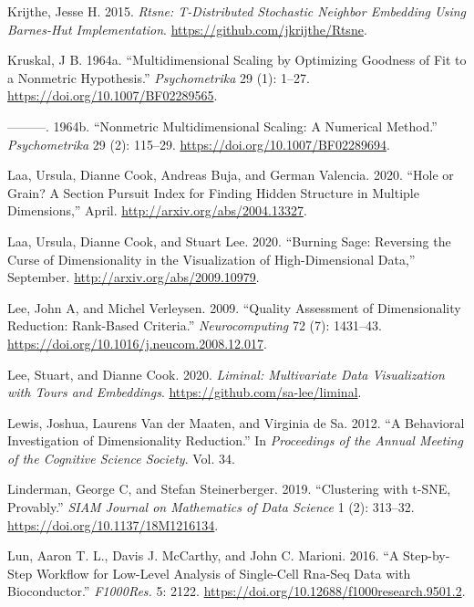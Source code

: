 \documentclass[article,notitle]{jdssv}
\begin{document}
\leavevmode\hypertarget{ref-Rtsne}{}%
Krijthe, Jesse H. 2015. \emph{Rtsne: T-Distributed Stochastic Neighbor Embedding Using Barnes-Hut Implementation}. \url{https://github.com/jkrijthe/Rtsne}.

\leavevmode\hypertarget{ref-Kruskal1964-cz}{}%
Kruskal, J B. 1964a. ``Multidimensional Scaling by Optimizing Goodness of Fit to a Nonmetric Hypothesis.'' \emph{Psychometrika} 29 (1): 1--27. \url{https://doi.org/10.1007/BF02289565}.

\leavevmode\hypertarget{ref-Kruskal1964-cw}{}%
---------. 1964b. ``Nonmetric Multidimensional Scaling: A Numerical Method.'' \emph{Psychometrika} 29 (2): 115--29. \url{https://doi.org/10.1007/BF02289694}.

\leavevmode\hypertarget{ref-Laa2020-wr}{}%
Laa, Ursula, Dianne Cook, Andreas Buja, and German Valencia. 2020. ``Hole or Grain? A Section Pursuit Index for Finding Hidden Structure in Multiple Dimensions,'' April. \url{http://arxiv.org/abs/2004.13327}.

\leavevmode\hypertarget{ref-Laa2020-vk}{}%
Laa, Ursula, Dianne Cook, and Stuart Lee. 2020. ``Burning Sage: Reversing the Curse of Dimensionality in the Visualization of High-Dimensional Data,'' September. \url{http://arxiv.org/abs/2009.10979}.

\leavevmode\hypertarget{ref-Lee2009-zb}{}%
Lee, John A, and Michel Verleysen. 2009. ``Quality Assessment of Dimensionality Reduction: Rank-Based Criteria.'' \emph{Neurocomputing} 72 (7): 1431--43. \url{https://doi.org/10.1016/j.neucom.2008.12.017}.

\leavevmode\hypertarget{ref-r-liminal}{}%
Lee, Stuart, and Dianne Cook. 2020. \emph{Liminal: Multivariate Data Visualization with Tours and Embeddings}. \url{https://github.com/sa-lee/liminal}.

\leavevmode\hypertarget{ref-Lewis2012-ai}{}%
Lewis, Joshua, Laurens Van der Maaten, and Virginia de Sa. 2012. ``A Behavioral Investigation of Dimensionality Reduction.'' In \emph{Proceedings of the Annual Meeting of the Cognitive Science Society}. Vol. 34.

\leavevmode\hypertarget{ref-Linderman2019-dq}{}%
Linderman, George C, and Stefan Steinerberger. 2019. ``Clustering with t-SNE, Provably.'' \emph{SIAM Journal on Mathematics of Data Science} 1 (2): 313--32. \url{https://doi.org/10.1137/18M1216134}.

\leavevmode\hypertarget{ref-Lun2016}{}%
Lun, Aaron T. L., Davis J. McCarthy, and John C. Marioni. 2016. ``A Step-by-Step Workflow for Low-Level Analysis of Single-Cell Rna-Seq Data with Bioconductor.'' \emph{F1000Res.} 5: 2122. \url{https://doi.org/10.12688/f1000research.9501.2}.
\end{document}
